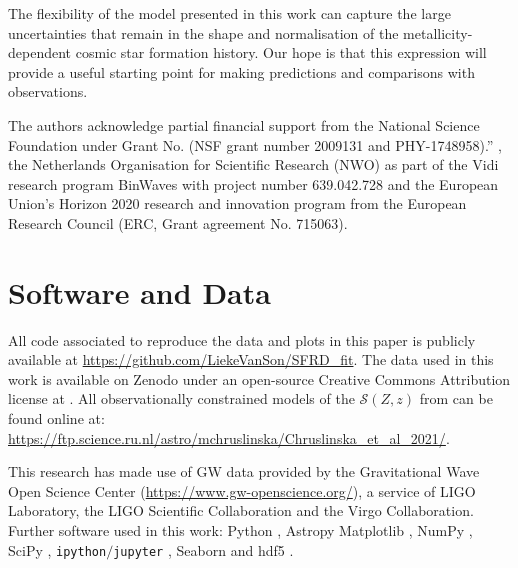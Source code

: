 \documentclass[linenumbers,twocolumn]{aastex631}
\newcommand{\SFRDzZ}{\ensuremath{\mathcal{S}(Z,z)}\xspace}
\begin{document}
The flexibility of the model presented in this work can capture the large uncertainties that remain in the shape and normalisation of the metallicity-dependent cosmic star formation history. 
Our hope is that this expression will provide a useful starting point for making predictions and comparisons with observations.


\begin{acknowledgments}
The authors acknowledge partial financial support from the  National Science Foundation under Grant No. (NSF grant number 2009131  and PHY-1748958).”
, the Netherlands Organisation for Scientific Research (NWO) as part of the Vidi research program BinWaves with project number 639.042.728 and the European Union’s Horizon 2020 research and innovation program from the European Research Council (ERC, Grant agreement No. 715063). 
\end{acknowledgments}


\section*{Software and Data}
All code associated to reproduce the data and plots in this paper is publicly available at \url{https://github.com/LiekeVanSon/SFRD_fit}.
The data used in this work is available on Zenodo under an open-source Creative Commons Attribution license at .
All observationally constrained models of the \SFRDzZ from \cite{Chruslinska+2021} can be found online at: \url{https://ftp.science.ru.nl/astro/mchruslinska/Chruslinska_et_al_2021/}.


This research has made use of GW data provided by the Gravitational Wave Open Science Center (\url{https://www.gw-openscience.org/}), a service of LIGO Laboratory, the LIGO Scientific Collaboration and the Virgo Collaboration. 
Further software used in this work: Python \citep{PythonReferenceManual},  Astropy \citep{astropy:2013,astropy:2018} Matplotlib \citep{2007CSE.....9...90H},  {NumPy} \citep{2020NumPy-Array}, SciPy \citep{2020SciPy-NMeth}, \texttt{ipython$/$jupyter} \citep{2007CSE.....9c..21P, Kluyver2016jupyter},  Seaborn \citep{waskom2020seaborn}  and  {hdf5}   \citep{collette_python_hdf5_2019}. 
\end{document}

